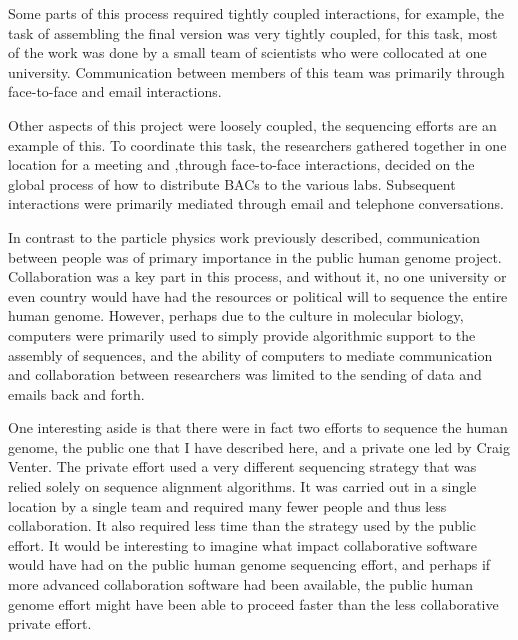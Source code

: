 Some parts of this process required tightly coupled interactions, for
example, the task of assembling the final version was very tightly
coupled, for this task, most of the work was done by a small team of
scientists who were collocated at one university.  Communication
between members of this team was primarily through face-to-face and
email interactions.

Other aspects of this project were loosely coupled, the sequencing
efforts are an example of this.  To coordinate this task, the
researchers gathered together in one location for a meeting and
,through face-to-face interactions, decided on the global process of
how to distribute BACs to the various labs.  Subsequent interactions
were primarily mediated through email and telephone conversations.

In contrast to the particle physics work previously described,
communication between people was of primary importance in the public
human genome project.  Collaboration was a key part in this process,
and without it, no one university or even country would have had the
resources or political will to sequence the entire human genome.
However, perhaps due to the culture in molecular biology, computers
were primarily used to simply provide algorithmic support to the
assembly of sequences, and the ability of computers to mediate
communication and collaboration between researchers was limited to the
sending of data and emails back and forth.

One interesting aside is that there were in fact two efforts to
sequence the human genome, the public one that I have described here,
and a private one led by Craig Venter.  The private effort used a very
different sequencing strategy that was relied solely on sequence
alignment algorithms.  It was carried out in a single location by a
single team and required many fewer people and thus less
collaboration.  It also required less time than the strategy used by
the public effort.  It would be interesting to imagine what impact
collaborative software would have had on the public human genome
sequencing effort, and perhaps if more advanced collaboration software
had been available, the public human genome effort might have been
able to proceed faster than the less collaborative private effort.

